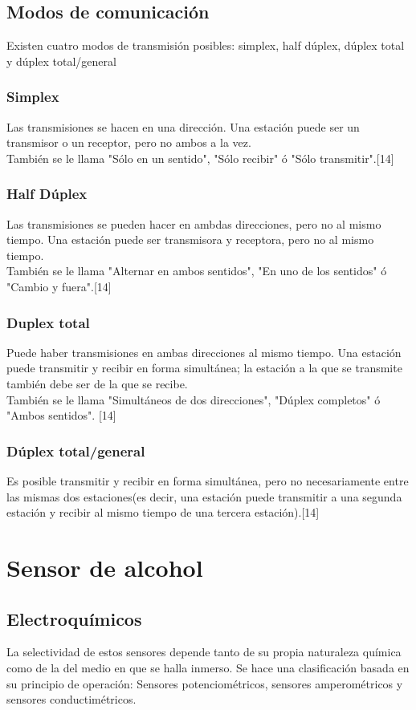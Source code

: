\section{Modos de comunicación}
Existen cuatro modos de transmisión posibles: simplex, half dúplex, dúplex total y dúplex total/general
\subsection{Simplex}
Las transmisiones se hacen en una dirección. Una estación puede ser un transmisor o un receptor, pero no ambos a la vez. \\
También se le llama "Sólo en un sentido", "Sólo recibir" ó "Sólo transmitir".[14]

\subsection{Half Dúplex}
Las transmisiones se pueden hacer en ambdas direcciones, pero no al mismo tiempo. Una estación puede ser transmisora y receptora, pero no al mismo tiempo. \\
También se le llama "Alternar en ambos sentidos", "En uno de los sentidos" ó "Cambio y fuera".[14]

\subsection{Duplex total}
Puede haber transmisiones en ambas direcciones al mismo tiempo. Una estación puede transmitir y recibir en forma simultánea; la estación a la que se transmite también debe ser de la que se recibe. \\
También se le llama "Simultáneos de dos direcciones", "Dúplex completos" ó "Ambos sentidos". [14]

\subsection{Dúplex total/general}
Es posible transmitir y recibir en forma simultánea, pero no necesariamente entre las mismas dos estaciones(es decir, una estación puede transmitir a una segunda estación y recibir al mismo tiempo de una tercera estación).[14]

\chapter{Sensor de alcohol}

\section{Electroquímicos}
La selectividad de estos sensores depende tanto de su propia naturaleza química como de la del medio en que se halla inmerso. Se hace una clasificación basada en su principio de operación: Sensores potenciométricos, sensores amperométricos y sensores conductimétricos.


